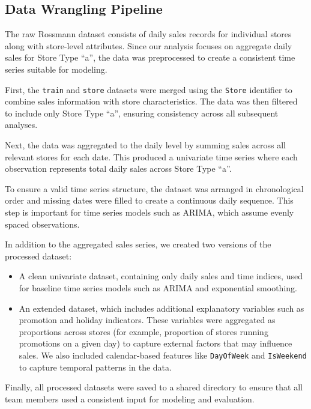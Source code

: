 \documentclass[
  12pt,
]{article}
\providecommand{\tightlist}{%
  \setlength{\itemsep}{0pt}\setlength{\parskip}{0pt}}
\begin{document}
\subsection{Data Wrangling Pipeline}\label{data-wrangling-pipeline}

The raw Rossmann dataset consists of daily sales records for individual
stores along with store-level attributes. Since our analysis focuses on
aggregate daily sales for Store Type ``a'', the data was preprocessed to
create a consistent time series suitable for modeling.

First, the \texttt{train} and \texttt{store} datasets were merged using
the \texttt{Store} identifier to combine sales information with store
characteristics. The data was then filtered to include only Store Type
``a'', ensuring consistency across all subsequent analyses.

Next, the data was aggregated to the daily level by summing sales across
all relevant stores for each date. This produced a univariate time
series where each observation represents total daily sales across Store
Type ``a''.

To ensure a valid time series structure, the dataset was arranged in
chronological order and missing dates were filled to create a continuous
daily sequence. This step is important for time series models such as
ARIMA, which assume evenly spaced observations.

In addition to the aggregated sales series, we created two versions of
the processed dataset:

\begin{itemize}
\tightlist
\item
  A clean univariate dataset, containing only daily sales and time
  indices, used for baseline time series models such as ARIMA and
  exponential smoothing.
\item
  An extended dataset, which includes additional explanatory variables
  such as promotion and holiday indicators. These variables were
  aggregated as proportions across stores (for example, proportion of
  stores running promotions on a given day) to capture external factors
  that may influence sales. We also included calendar-based features
  like \texttt{DayOfWeek} and \texttt{IsWeekend} to capture temporal
  patterns in the data.
\end{itemize}

Finally, all processed datasets were saved to a shared directory to
ensure that all team members used a consistent input for modeling and
evaluation.
\end{document}
